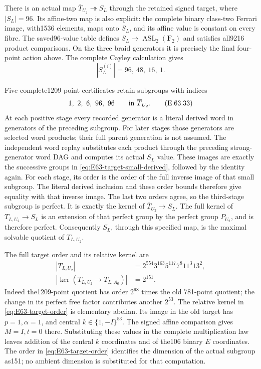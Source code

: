 There is an actual map $\overline T_{U_2}\twoheadrightarrow S_L$
through the retained signed target, where $|S_L|=96$.
Its affine-two map is also explicit: the complete binary class-two
Ferrari image, with1536 elements, maps onto $S_L$, and its affine
value is constant on every fibre. The saved96-value table defines
$S_L\to\operatorname{ASL}_2(\mathbf F_2)$ and satisfies all9216
product comparisons. On the three braid generators it is precisely
the final four-point action above. The complete Cayley calculation gives
\begin{equation}
 |S_L^{(i)}|=96,\ 48,\ 16,\ 1.
 \tag{E.63.32}\label{eq:E63-target-small-derived}
\end{equation}

Five complete1209-point certificates retain subgroups with indices
\begin{equation}
 1,\ 2,\ 6,\ 96,\ 96
 \qquad\hbox{in }\overline T_{U_2}.
 \tag{E.63.33}\label{eq:E63-target-indices}
\end{equation}
At each positive stage every recorded generator is a literal derived
word in generators of the preceding subgroup. For later stages those
generators are selected word products; their full parent generation is
not assumed. The independent word replay substitutes each product
through the preceding strong-generator word DAG and computes its
actual $S_L$ value. These images are exactly the successive groups in
\eqref{eq:E63-target-small-derived}, followed by the identity again.
For each stage, its order is the order of the full inverse image of
that small subgroup. The literal derived inclusion and these order
bounds therefore give equality with that inverse image. The last two
orders agree, so the third-stage subgroup is perfect. It is exactly
the kernel of $\overline T_{U_2}\to S_L$.
The full kernel of $T_{L,U_2}\to S_L$ is an extension of that perfect
group by the perfect group $P_{U_2}$, and is therefore perfect.
Consequently $S_L$, through this specified map, is the maximal
solvable quotient of $T_{L,U_2}$.

The full target order and its relative kernel are
\begin{equation}
 \begin{aligned}
 |T_{L,U_2}|&=2^{554}3^{163}5^{117}7^8 11^3 13^2,\\
 |\ker(T_{L,U_2}\longrightarrow T_{L,A_6})|&=2^{151}.
 \end{aligned}
 \tag{E.63.34}\label{eq:E63-target-order}
\end{equation}
Indeed the1209-point quotient has order $2^{98}$ times the old
781-point quotient; the change in its perfect free factor contributes
another $2^{53}$. The relative kernel in
\eqref{eq:E63-target-order} is elementary abelian. Its image in the
old target has $p=1,\alpha=1$, and central $k\in\{1,-I\}^{53}$.
The signed affine comparison gives $M=I,t=0$ there. Substituting these
values in the complete multiplication law leaves addition of the
central $k$ coordinates and of the106 binary $E$ coordinates.
The order in \eqref{eq:E63-target-order} identifies the dimension
of the actual subgroup as151; no ambient dimension is substituted
for that computation.

